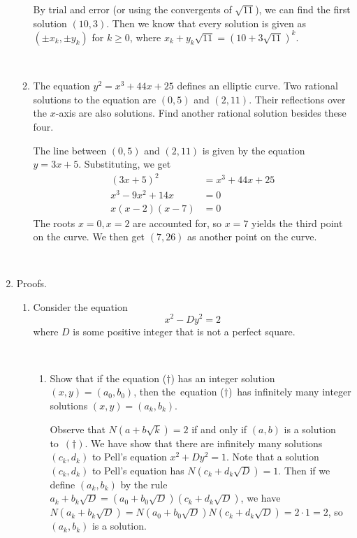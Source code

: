 \documentclass[12pt]{amsart}
\newcommand{\solution}[1]{\ifthenelse {\equal{\displaysol}{1}} {\begin{framed}{\color{meretale}\noindent #1}\end{framed}} { \ }}
\begin{document}
\begin{enumerate}
\begin{enumerate}
\solution{By trial and error (or using the convergents of $\sqrt{11}$), we can find the first solution $(10,3)$. Then we know that every solution is given as $(\pm x_k, \pm y_k)$ for $k\geq 0$, where $x_k + y_k\sqrt{11} = (10+3\sqrt{11})^k$.
}


\vfill


\newpage

\item The equation $y^2 = x^3 +44x + 25$ defines an elliptic curve. Two rational solutions to the equation are $(0, 5)$ and $(2, 11)$. Their reflections over the $x$-axis are also solutions. Find another rational solution besides these four.

\solution{The line between $(0,5)$ and $(2,11)$ is given by the equation $y=3x+5$. Substituting, we get 
\[\begin{aligned} (3x+5)^2&= x^3 + 44x + 25\\
x^3 - 9x^2 +14x &= 0\\
x(x-2)(x-7)&=0
\end{aligned}\]
The roots $x=0, x=2$ are accounted for, so $x=7$ yields the third point on the curve. We then get $(7,26)$ as another point on the curve.
}


\vfill


\newpage



\end{enumerate}

\newpage





\item Proofs.

\bigskip

\begin{enumerate}
\item Consider the equation
\begin{equation}\tag{$\dagger$} x^2 - D y^2 = 2 \end{equation}
where $D$ is some positive integer that is not a perfect square.

\
\begin{enumerate}
\item Show that if  the equation ($\dagger$) has an integer solution $(x,y)=(a_0,b_0)$, then the~equation ($\dagger$)~has infinitely many integer solutions $(x,y)=(a_k,b_k)$.

\solution{Observe that $N(a+ b\sqrt{k}) = 2$ if and only if $(a,b)$ is a solution to~$(\dagger)$. We have show that there are infinitely many solutions $(c_k,d_k)$ to Pell's equation $x^2 + Dy^2 =1$. Note that a solution $(c_k,d_k)$ to Pell's equation has ${N(c_k+d_k\sqrt{D})=1}$. Then if we define $(a_k,b_k)$ by the rule ${a_k +b_k \sqrt{D} = (a_0 + b_0\sqrt{D})(c_k+d_k\sqrt{D})}$, we have ${N(a_k +b_k \sqrt{D} )} = {N(a_0 + b_0\sqrt{D})N(c_k+d_k\sqrt{D})}=2\cdot 1 = 2$, so $(a_k,b_k)$ is a solution. 

}
\end{enumerate}
\end{enumerate}
\end{enumerate}
\end{document}
